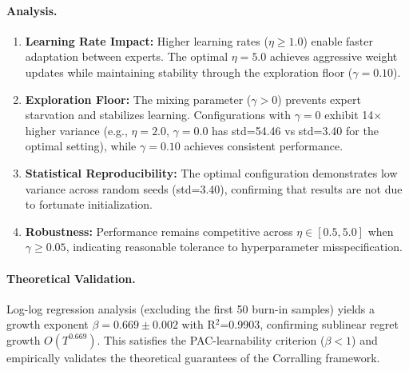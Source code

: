 \paragraph{Analysis.}
\begin{enumerate}[nosep]
    \item \textbf{Learning Rate Impact:} Higher learning rates ($\eta \geq 1.0$) enable faster adaptation between experts. The optimal $\eta=5.0$ achieves aggressive weight updates while maintaining stability through the exploration floor ($\gamma=0.10$).
    
    \item \textbf{Exploration Floor:} The mixing parameter ($\gamma > 0$) prevents expert starvation and stabilizes learning. Configurations with $\gamma=0$ exhibit 14$\times$ higher variance (e.g., $\eta=2.0$, $\gamma=0.0$ has std=54.46 vs std=3.40 for the optimal setting), while $\gamma=0.10$ achieves consistent performance.
    
    \item \textbf{Statistical Reproducibility:} The optimal configuration demonstrates low variance across random seeds (std=3.40), confirming that results are not due to fortunate initialization.
    
    \item \textbf{Robustness:} Performance remains competitive across $\eta \in [0.5, 5.0]$ when $\gamma \geq 0.05$, indicating reasonable tolerance to hyperparameter misspecification.
\end{enumerate}

\paragraph{Theoretical Validation.}
Log-log regression analysis (excluding the first 50 burn-in samples) yields a growth exponent $\beta=0.669 \pm 0.002$ with R$^2$=0.9903, confirming sublinear regret growth $O(T^{0.669})$.
This satisfies the PAC-learnability criterion ($\beta < 1$) and empirically validates the theoretical guarantees of the Corralling framework.

